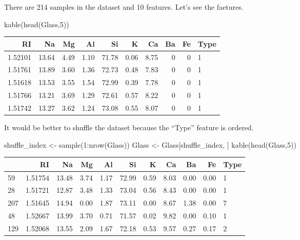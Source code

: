 \documentclass[
]{article}
\newenvironment{Shaded}{\begin{snugshade}}{\end{snugshade}}
\newcommand{\DecValTok}[1]{\textcolor[rgb]{0.00,0.00,0.81}{#1}}
\newcommand{\FunctionTok}[1]{\textcolor[rgb]{0.00,0.00,0.00}{#1}}
\newcommand{\NormalTok}[1]{#1}
\newcommand{\OtherTok}[1]{\textcolor[rgb]{0.56,0.35,0.01}{#1}}
\newcommand{\SpecialCharTok}[1]{\textcolor[rgb]{0.00,0.00,0.00}{#1}}
\begin{document}
There are 214 samples in the dataset and 10 features. Let's see the
faetures.

\begin{Shaded}
\begin{Highlighting}[]
\FunctionTok{kable}\NormalTok{(}\FunctionTok{head}\NormalTok{(Glass,}\DecValTok{5}\NormalTok{))}
\end{Highlighting}
\end{Shaded}

\begin{longtable}[]{@{}rrrrrrrrrl@{}}
\toprule
RI & Na & Mg & Al & Si & K & Ca & Ba & Fe & Type \\
\midrule
\endhead
1.52101 & 13.64 & 4.49 & 1.10 & 71.78 & 0.06 & 8.75 & 0 & 0 & 1 \\
1.51761 & 13.89 & 3.60 & 1.36 & 72.73 & 0.48 & 7.83 & 0 & 0 & 1 \\
1.51618 & 13.53 & 3.55 & 1.54 & 72.99 & 0.39 & 7.78 & 0 & 0 & 1 \\
1.51766 & 13.21 & 3.69 & 1.29 & 72.61 & 0.57 & 8.22 & 0 & 0 & 1 \\
1.51742 & 13.27 & 3.62 & 1.24 & 73.08 & 0.55 & 8.07 & 0 & 0 & 1 \\
\bottomrule
\end{longtable}

It would be better to shuffle the dataset because the ``Type'' feature
is ordered.

\begin{Shaded}
\begin{Highlighting}[]
\NormalTok{shuffle\_index }\OtherTok{\textless{}{-}} \FunctionTok{sample}\NormalTok{(}\DecValTok{1}\SpecialCharTok{:}\FunctionTok{nrow}\NormalTok{(Glass))}
\NormalTok{Glass }\OtherTok{\textless{}{-}}\NormalTok{ Glass[shuffle\_index, ] }
\FunctionTok{kable}\NormalTok{(}\FunctionTok{head}\NormalTok{(Glass,}\DecValTok{5}\NormalTok{))}
\end{Highlighting}
\end{Shaded}

\begin{longtable}[]{@{}lrrrrrrrrrl@{}}
\toprule
& RI & Na & Mg & Al & Si & K & Ca & Ba & Fe & Type \\
\midrule
\endhead
59 & 1.51754 & 13.48 & 3.74 & 1.17 & 72.99 & 0.59 & 8.03 & 0.00 & 0.00 &
1 \\
28 & 1.51721 & 12.87 & 3.48 & 1.33 & 73.04 & 0.56 & 8.43 & 0.00 & 0.00 &
1 \\
207 & 1.51645 & 14.94 & 0.00 & 1.87 & 73.11 & 0.00 & 8.67 & 1.38 & 0.00
& 7 \\
48 & 1.52667 & 13.99 & 3.70 & 0.71 & 71.57 & 0.02 & 9.82 & 0.00 & 0.10 &
1 \\
129 & 1.52068 & 13.55 & 2.09 & 1.67 & 72.18 & 0.53 & 9.57 & 0.27 & 0.17
& 2 \\
\bottomrule
\end{longtable}
\end{document}
